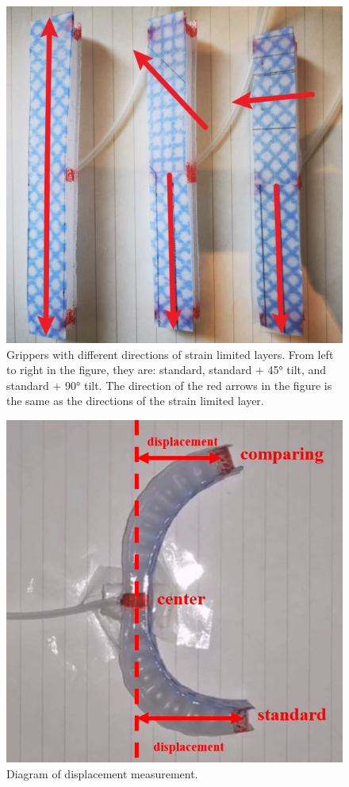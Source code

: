 \documentclass[conference]{IEEEtran}
\begin{document}
\begin{figure}
    \centering
    \includegraphics[width = 0.85\linewidth]{pics/实验示意图1.png}
    \caption{Grippers with different directions of strain limited layers. From left to right in the figure, they are: standard, standard $+$ 45° tilt, and standard $+$ 90° tilt. The direction of the red arrows in the figure is the same as the directions of the strain limited layer.}
    \label{fig:Grippers}
\end{figure}

\begin{figure}
    \centering
    \includegraphics[width = 0.85\linewidth]{pics/位移计量示意图.png}
    \caption{Diagram of displacement measurement.}
    \label{fig:Displacement}
\end{figure}
\end{document}
